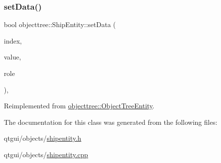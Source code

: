 \subsubsection{\texorpdfstring{setData()}{setData()}}
{\footnotesize\ttfamily bool objecttree\+::\+Ship\+Entity\+::set\+Data (\begin{DoxyParamCaption}\item[{const Q\+Model\+Index \&}]{index,  }\item[{const Q\+Variant \&}]{value,  }\item[{int}]{role }\end{DoxyParamCaption})\hspace{0.3cm}{\ttfamily [override]}, {\ttfamily [virtual]}}



Reimplemented from \mbox{\hyperlink{classobjecttree_1_1_object_tree_entity_ab6742194e637093cb1571998bee88ff5}{objecttree\+::\+Object\+Tree\+Entity}}.



The documentation for this class was generated from the following files\+:\begin{DoxyCompactItemize}
\item 
qtgui/objects/\mbox{\hyperlink{shipentity_8h}{shipentity.\+h}}\item 
qtgui/objects/\mbox{\hyperlink{shipentity_8cpp}{shipentity.\+cpp}}\end{DoxyCompactItemize}

